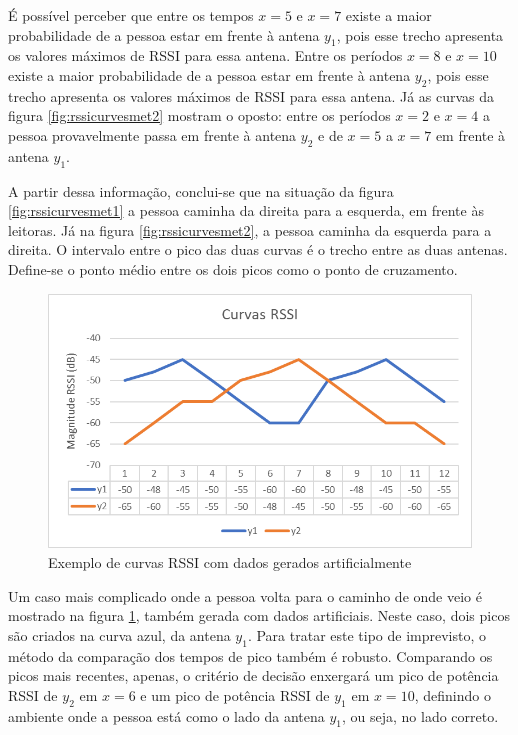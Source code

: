  É possível perceber que entre os tempos $x=5$ e $x=7$ existe a maior probabilidade de a pessoa estar em frente à antena $y_1$, pois esse trecho apresenta os valores máximos de RSSI para essa antena. Entre os períodos $x=8$ e $x=10$ existe a maior probabilidade de a pessoa estar em frente à antena $y_2$, pois esse trecho apresenta os valores máximos de RSSI para essa antena. Já as curvas da figura \ref{fig:rssicurvesmet2} mostram o oposto: entre os períodos $x=2$ e $x=4$ a pessoa provavelmente passa em frente à antena $y_2$ e de $x=5$ a $x=7$ em frente à antena $y_1$.
 
 A partir dessa informação, conclui-se que na situação da figura \ref{fig:rssicurvesmet1} a pessoa caminha da direita para a esquerda, em frente às leitoras. Já na figura \ref{fig:rssicurvesmet2}, a pessoa caminha da esquerda para a direita. O intervalo entre o pico das duas curvas é o trecho entre as duas antenas. Define-se o ponto médio entre os dois picos como o ponto de cruzamento.
 
  \begin{figure}[H]
    \centering
    \includegraphics[width=0.8\linewidth]{figs/Metodologia/curvas1.png}
    \caption{Exemplo de curvas RSSI com dados gerados artificialmente}
    \label{fig:rssicurvesmet3}
\end{figure}

Um caso mais complicado onde a pessoa volta para o caminho de onde veio é mostrado na figura \ref{fig:rssicurvesmet3}, também gerada com dados artificiais. Neste caso, dois picos são criados na curva azul, da antena $y_1$. Para tratar este tipo de imprevisto, o método da comparação dos tempos de pico também é robusto. Comparando os picos mais recentes, apenas, o critério de decisão enxergará um pico de potência RSSI de $y_2$ em $x=6$ e um pico de potência RSSI de $y_1$ em $x=10$, definindo o ambiente onde a pessoa está como o lado da antena $y_1$, ou seja, no lado correto.
 
